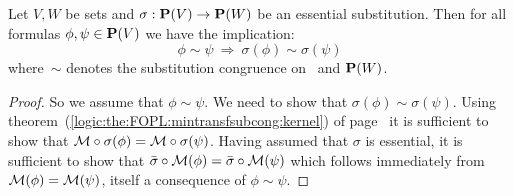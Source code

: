 \begin{prop}\label{logic:prop:FOPL:esssubstprop:equivalence}
Let $V,W$ be sets and $\sigma:\mbox{${\bf P}(V)$}\to {\bf P}(W)$ be an essential
substitution. Then for all formulas $\phi,\psi\in\mbox{${\bf P}(V)$}$ we have the
implication:
    \[
    \phi\sim\psi\ \Rightarrow\ \sigma(\phi)\sim\sigma(\psi)
    \]
where~$\sim$ denotes the substitution congruence on \pv\ and ${\bf
P}(W)$.
\end{prop}
\begin{proof}
So we assume that $\phi\sim\psi$. We need to show that
$\sigma(\phi)\sim\sigma(\psi)$. Using
theorem~(\ref{logic:the:FOPL:mintransfsubcong:kernel}) of
page~\pageref{logic:the:FOPL:mintransfsubcong:kernel} it is
sufficient to show that ${\cal M}\circ\sigma(\phi)={\cal
M}\circ\sigma(\psi)$. Having assumed that $\sigma$ is essential, it
is sufficient to show that $\bar{\sigma}\circ{\cal
M}(\phi)=\bar{\sigma}\circ{\cal M}(\psi)$ which follows immediately
from ${\cal M}(\phi)={\cal M}(\psi)$, itself a consequence of
$\phi\sim\psi$.
\end{proof}

